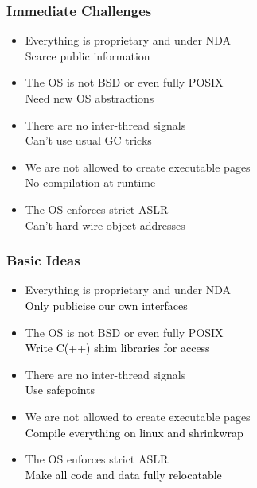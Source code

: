 \documentclass[14pt,t,aspectratio=169]{beamer}
\begin{document}
\begin{frame}
  \frametitle{Immediate Challenges}
  \begin{itemize}
  \item Everything is proprietary and under NDA \\
    \Rightarrow{} Scarce public information
  \item The OS is not BSD or even fully POSIX \\
    \Rightarrow{} Need new OS abstractions
  \item There are no inter-thread signals \\
    \Rightarrow{} Can't use usual GC tricks
  \item We are not allowed to create executable pages \\
    \Rightarrow{} No compilation at runtime
  \item The OS enforces strict ASLR \\
    \Rightarrow{} Can't hard-wire object addresses
  \end{itemize}
\end{frame}

\begin{frame}
  \frametitle{Basic Ideas}
  \begin{itemize}
    \color{lightgray}
  \item Everything is proprietary and under NDA \\
    \textcolor{red}{\Rightarrow} \textcolor{black}{Only publicise our own interfaces}
  \item The OS is not BSD or even fully POSIX \\
    \textcolor{red}{\Rightarrow} \textcolor{black}{Write C(++) shim libraries for access}
  \item There are no inter-thread signals \\
    \textcolor{red}{\Rightarrow} \textcolor{black}{Use safepoints}
  \item We are not allowed to create executable pages \\
    \textcolor{red}{\Rightarrow} \textcolor{black}{Compile everything on linux
      and shrinkwrap}
  \item The OS enforces strict ASLR \\
    \textcolor{red}{\Rightarrow} \textcolor{black}{Make all code and data fully
      relocatable}
  \end{itemize}
\end{frame}
\end{document}
